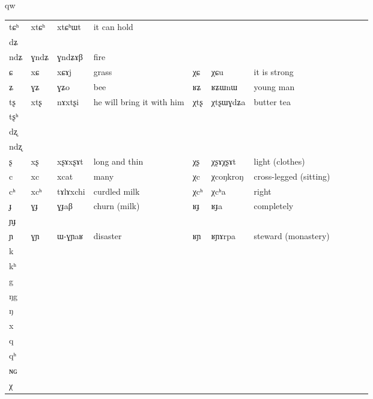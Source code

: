 qw\documentclass[oldfontcommands,oneside,a4paper,11pt]{article}
\newcommand{\ipa}[1]{{\phon #1}} %
\newcommand{\tib}[1]{\cellcolor{lightgray}\textbf{#1}}
\newcommand{\idph}[1]{\cellcolor{gray}\textbf{#1}}
\begin{document}
\begin{table}
{\begin{tabular}{l|lll|lll|lll|l}
\ipa{tɕʰ}  & 	 \ipa{xtɕʰ}  & 	 \ipa{xtɕʰɯt}  & 	it can hold  & 	  & 	  & 	 \\  
\ipa{dʑ}  & 	  & 	  & 	  & 	  & 	  & 	 \\  
\ipa{ndʑ}  & 	 \ipa{ɣndʑ}  & 	 \ipa{ɣndʑɤβ}  & 	fire  & 	  & 	  & 	 \\  
\ipa{ɕ}  & 	 \ipa{xɕ}  & 	 \ipa{xɕɤj}  & 	grass  & 	 \ipa{χɕ}  & 	 \ipa{χɕu}  & 	it is strong \\  
\ipa{ʑ}  & 	 \ipa{ɣʑ}  & 	 \ipa{ɣʑo}  & 	bee  & 	 \ipa{ʁʑ}  & 	 \ipa{ʁʑɯnɯ}  & 	young man \\  
\ipa{tʂ}  & 	 \ipa{xtʂ}  & 	 \ipa{nɤxtʂi}  & 	 he will bring it with him & 	 \ipa{χtʂ}  \tib{}& 	 \ipa{χtʂɯɣdʑa}  & 	butter tea \\  
\ipa{tʂʰ}  & 	  & 	  & 	  & 	  & 	  & 	 \\  
\ipa{dʐ}  & 	  & 	  & 	  & 	  & 	  & 	 \\  
\ipa{ndʐ}  & 	  & 	  & 	  & 	  & 	  & 	 \\  
\ipa{ʂ}  & 	 \ipa{xʂ} \idph{}  & 	 \ipa{xʂɤxʂɤt }  & 	long and thin  & 	 \ipa{χʂ} \idph{}  & 	 \ipa{χʂɤχʂɤt}  & 	light (clothes) \\  
\ipa{c}  & 	 \ipa{xc}  & 	 \ipa{xcat}  & 	many  & 	 \ipa{χc} \tib{}  & 	 \ipa{χcoŋkroŋ}  & 	 cross-legged (sitting)\\  
\ipa{cʰ}  & 	 \ipa{xcʰ}  & 	 \ipa{tɤlɤxchi}  & 	curdled milk  & 	 \ipa{χcʰ}  & 	 \ipa{χcʰa}  & 	 right\\  
\ipa{ɟ}  & 	 \ipa{ɣɟ}  & 	 \ipa{ɣɟaβ}  & 	 churn (milk) & 	 \ipa{ʁɟ}  & 	 \ipa{ʁɟa}  & 	completely \\  
\ipa{ɲɟ}  & 	  & 	  & 	  & 	  & 	  & 	 \\  
\ipa{ɲ}  & 	 \ipa{ɣɲ}  & 	 \ipa{ɯ-ɣɲaʁ}  & 	 disaster & 	 \ipa{ʁɲ}\tib{}  & 	 \ipa{ʁɲɤrpa}  & 	steward (monastery) \\  
\ipa{k}  & 	  & 	  & 	  & 	  & 	  & 	 \\  
\ipa{kʰ}  & 	  & 	  & 	  & 	  & 	  & 	 \\  
\ipa{g}  & 	  & 	  & 	  & 	  & 	  & 	 \\  
\ipa{ŋg}  & 	  & 	  & 	  & 	  & 	  & 	 \\  
\ipa{ŋ}  & 	  & 	  & 	  & 	  & 	  & 	 \\  
\ipa{x}  & 	  & 	  & 	  & 	  & 	  & 	 \\  
\ipa{q}  & 	  & 	  & 	  & 	  & 	  & 	 \\  
\ipa{qʰ}  & 	  & 	  & 	  & 	  & 	  & 	 \\  
\ipa{ɴɢ}  & 	 & 	 & 	 & 	 & 	 & 	\\
\ipa{χ}  & 	 & 	 & 	 & 	 & 	 & 	\\
\bottomrule
\end{tabular}}
\end{table}
\end{document}
